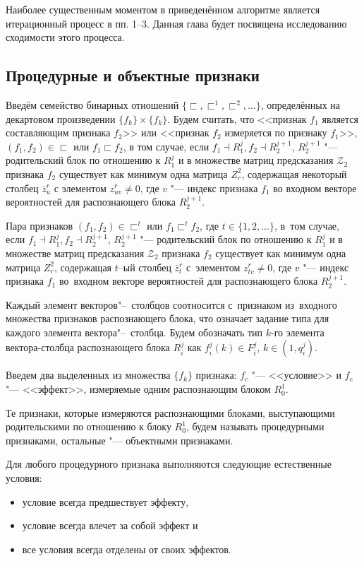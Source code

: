 Наиболее существенным моментом в приведенённом алгоритме является итерационный процесс в пп. 1--3. Данная глава будет посвящена исследованию сходимости этого процесса.

\subsection{Процедурные и объектные признаки}

Введём семейство бинарных отношений $\{\sqsubset,\sqsubset^1,\sqsubset^2,\dots\}$, определённых на декартовом произведении $\{f_k\}\times \{f_k\}$. Будем считать, что <<признак $f_1$ является составляющим признака $f_2$>> или <<признак $f_2$ измеряется по признаку $f_1$>>, $(f_1,f_2 )\in\sqsubset$ или $f_1\sqsubset f_2$, в том случае, если $f_1\dashv R_1^j, f_2\dashv R_2^{j+1}$, $R_2^{j+1}$ "--- родительский блок по отношению к $R_1^j$ и в множестве матриц предсказания $\mathcal Z_2$ признака $f_2$ существует как минимум одна матрица $Z_r^2$, содержащая некоторый столбец $\bar z_u^r$ с элементом $z_{uv}^r\not=0$, где $v$ "--- индекс признака $f_1$ во входном векторе вероятностей для распознающего блока $R_2^{j+1}$.

Пара признаков $(f_1,f_2)\in\sqsubset^t$ или $f_1\sqsubset^t f_2$, где $t\in\{1,2,\dots\}$, в~том случае, если $f_1\dashv R_1^j, f_2\dashv R_2^{j+1}$, $R_2^{j+1}$ "--- родительский блок по отношению к $R_1^j$ и в множестве матриц предсказания $\mathcal Z_2$ признака $f_2$ существует как минимум одна матрица $Z_r^2$, содержащая $t$–ый столбец $\bar z_t^r$ с~элементом $z_{tv}^r\not=0$, где $v$ "--- индекс признака $f_1$ во~входном векторе вероятностей для распознающего блока $R_2^{j+1}$.

Каждый элемент векторов"--~столбцов соотносится с~признаком из~входного множества признаков распознающего блока, что означает задание типа для каждого элемента вектора"--~столбца. Будем обозначать тип $k$-го элемента вектора-столбца распознающего блока $R_i^j$ как $f_i^j(k)\in F_i^j$, $k\in(1,q_i^j)$. 

Введем два выделенных из множества $\{f_k\}$ признака: $f_c$ "--- <<условие>> и $f_e$ "--- <<эффект>>, измеряемые одним распознающим блоком $R_0^1$.
\begin{Def}
	Те признаки, которые измеряются распознающими блоками, выступающими родительскими по отношению к блоку $R_0^1$, будем называть процедурными признаками, остальные "--- объектными признаками.
\end{Def}
Для любого процедурного признака выполняются следующие естественные условия:
\begin{itemize}
	\item условие всегда предшествует эффекту,
	\item условие всегда влечет за собой эффект и
	\item все условия всегда отделены от своих эффектов.
\end{itemize}

